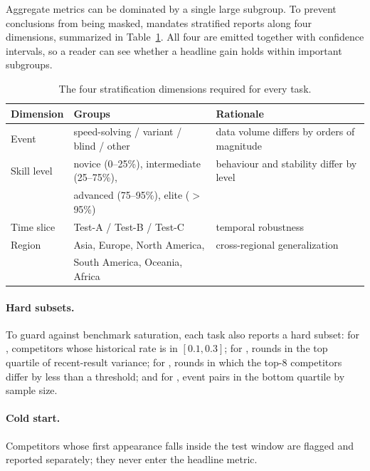 Aggregate metrics can be dominated by a single large subgroup. To prevent
conclusions from being masked, \wcabench{} mandates stratified reports along
four dimensions, summarized in Table~\ref{tab:strat}. All four are emitted
together with confidence intervals, so a reader can see whether a headline gain
holds within important subgroups.

\begin{table}[t]
  \centering
  \small
  \begin{threeparttable}
  \caption{The four stratification dimensions required for every task.}
  \label{tab:strat}
  \begin{tabular}{@{}lll@{}}
    \toprule
    Dimension & Groups & Rationale \\
    \midrule
    Event & speed-solving / variant / blind / other & data volume differs by orders of magnitude \\
    Skill level & novice (0--25\%), intermediate (25--75\%), & behaviour and stability differ by level \\
                & advanced (75--95\%), elite ($>$95\%) & \\
    Time slice & Test-A / Test-B / Test-C & temporal robustness \\
    Region & Asia, Europe, North America, & cross-regional generalization \\
           & South America, Oceania, Africa & \\
    \bottomrule
  \end{tabular}
  \end{threeparttable}
\end{table}

\paragraph{Hard subsets.}
To guard against benchmark saturation, each task also reports a hard subset:
for , competitors whose historical \DNF{} rate is in $[0.1, 0.3]$; for
, rounds in the top quartile of recent-result variance; for ,
rounds in which the top-8 competitors differ by less than a threshold; and for
, event pairs in the bottom quartile by sample size.

\paragraph{Cold start.}
Competitors whose first appearance falls inside the test window are flagged and
reported separately; they never enter the headline metric.

